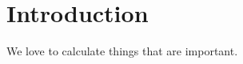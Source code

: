 \section{Introduction}
\label{sec:intro}

We love to calculate things that are important.
\cite{Gleisberg:2008ta}
